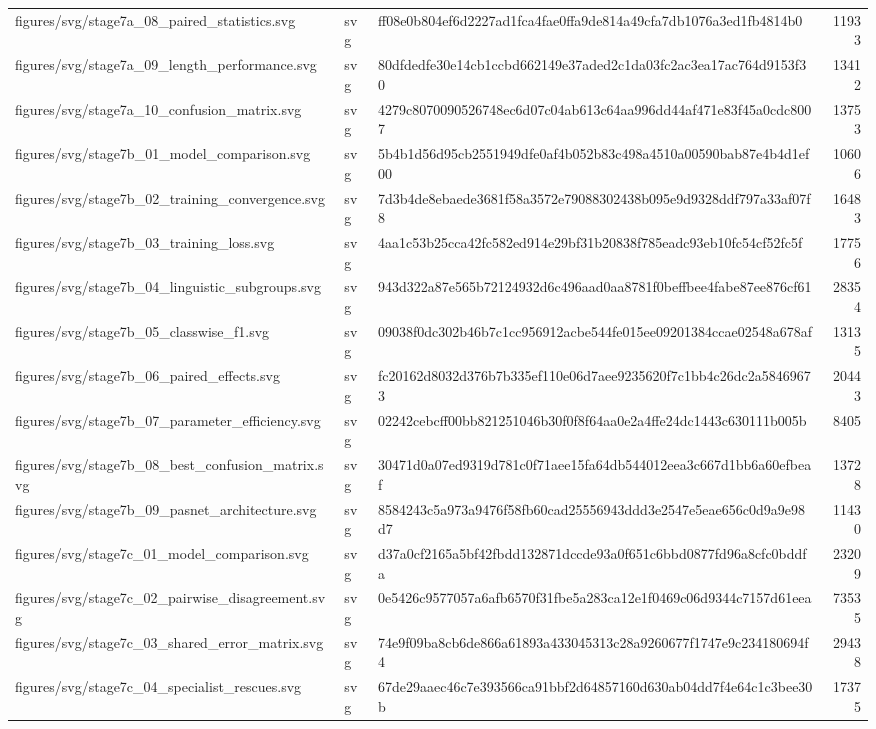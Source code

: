 \begin{tabular}{lllr}
figures/svg/stage7a_08_paired_statistics.svg & svg & ff08e0b804ef6d2227ad1fca4fae0ffa9de814a49cfa7db1076a3ed1fb4814b0 & 11933 \\
figures/svg/stage7a_09_length_performance.svg & svg & 80dfdedfe30e14cb1ccbd662149e37aded2c1da03fc2ac3ea17ac764d9153f30 & 13412 \\
figures/svg/stage7a_10_confusion_matrix.svg & svg & 4279c8070090526748ec6d07c04ab613c64aa996dd44af471e83f45a0cdc8007 & 13753 \\
figures/svg/stage7b_01_model_comparison.svg & svg & 5b4b1d56d95cb2551949dfe0af4b052b83c498a4510a00590bab87e4b4d1ef00 & 10606 \\
figures/svg/stage7b_02_training_convergence.svg & svg & 7d3b4de8ebaede3681f58a3572e79088302438b095e9d9328ddf797a33af07f8 & 16483 \\
figures/svg/stage7b_03_training_loss.svg & svg & 4aa1c53b25cca42fc582ed914e29bf31b20838f785eadc93eb10fc54cf52fc5f & 17756 \\
figures/svg/stage7b_04_linguistic_subgroups.svg & svg & 943d322a87e565b72124932d6c496aad0aa8781f0beffbee4fabe87ee876cf61 & 28354 \\
figures/svg/stage7b_05_classwise_f1.svg & svg & 09038f0dc302b46b7c1cc956912acbe544fe015ee09201384ccae02548a678af & 13135 \\
figures/svg/stage7b_06_paired_effects.svg & svg & fc20162d8032d376b7b335ef110e06d7aee9235620f7c1bb4c26dc2a58469673 & 20443 \\
figures/svg/stage7b_07_parameter_efficiency.svg & svg & 02242cebcff00bb821251046b30f0f8f64aa0e2a4ffe24dc1443c630111b005b & 8405 \\
figures/svg/stage7b_08_best_confusion_matrix.svg & svg & 30471d0a07ed9319d781c0f71aee15fa64db544012eea3c667d1bb6a60efbeaf & 13728 \\
figures/svg/stage7b_09_pasnet_architecture.svg & svg & 8584243c5a973a9476f58fb60cad25556943ddd3e2547e5eae656c0d9a9e98d7 & 11430 \\
figures/svg/stage7c_01_model_comparison.svg & svg & d37a0cf2165a5bf42fbdd132871dccde93a0f651c6bbd0877fd96a8cfc0bddfa & 23209 \\
figures/svg/stage7c_02_pairwise_disagreement.svg & svg & 0e5426c9577057a6afb6570f31fbe5a283ca12e1f0469c06d9344c7157d61eea & 73535 \\
figures/svg/stage7c_03_shared_error_matrix.svg & svg & 74e9f09ba8cb6de866a61893a433045313c28a9260677f1747e9c234180694f4 & 29438 \\
figures/svg/stage7c_04_specialist_rescues.svg & svg & 67de29aaec46c7e393566ca91bbf2d64857160d630ab04dd7f4e64c1c3bee30b & 17375 \\

\end{tabular}
